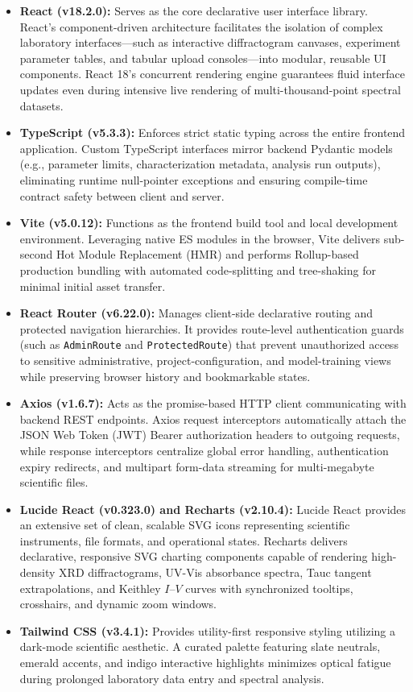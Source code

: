 \documentclass[12pt,a4paper,oneside]{report}
\begin{document}
{{{\begin{itemize}
    \item \textbf{React (v18.2.0):} Serves as the core declarative user interface library. React's component-driven architecture facilitates the isolation of complex laboratory interfaces—such as interactive diffractogram canvases, experiment parameter tables, and tabular upload consoles—into modular, reusable UI components. React 18's concurrent rendering engine guarantees fluid interface updates even during intensive live rendering of multi-thousand-point spectral datasets.
    \item \textbf{TypeScript (v5.3.3):} Enforces strict static typing across the entire frontend application. Custom TypeScript interfaces mirror backend Pydantic models (e.g., parameter limits, characterization metadata, analysis run outputs), eliminating runtime null-pointer exceptions and ensuring compile-time contract safety between client and server.
    \item \textbf{Vite (v5.0.12):} Functions as the frontend build tool and local development environment. Leveraging native ES modules in the browser, Vite delivers sub-second Hot Module Replacement (HMR) and performs Rollup-based production bundling with automated code-splitting and tree-shaking for minimal initial asset transfer.
    \item \textbf{React Router (v6.22.0):} Manages client-side declarative routing and protected navigation hierarchies. It provides route-level authentication guards (such as \texttt{AdminRoute} and \texttt{ProtectedRoute}) that prevent unauthorized access to sensitive administrative, project-configuration, and model-training views while preserving browser history and bookmarkable states.
    \item \textbf{Axios (v1.6.7):} Acts as the promise-based HTTP client communicating with backend REST endpoints. Axios request interceptors automatically attach the JSON Web Token (JWT) Bearer authorization headers to outgoing requests, while response interceptors centralize global error handling, authentication expiry redirects, and multipart form-data streaming for multi-megabyte scientific files.
    \item \textbf{Lucide React (v0.323.0) and Recharts (v2.10.4):} Lucide React provides an extensive set of clean, scalable SVG icons representing scientific instruments, file formats, and operational states. Recharts delivers declarative, responsive SVG charting components capable of rendering high-density XRD diffractograms, UV-Vis absorbance spectra, Tauc tangent extrapolations, and Keithley $I\text{--}V$ curves with synchronized tooltips, crosshairs, and dynamic zoom windows.
    \item \textbf{Tailwind CSS (v3.4.1):} Provides utility-first responsive styling utilizing a dark-mode scientific aesthetic. A curated palette featuring slate neutrals, emerald accents, and indigo interactive highlights minimizes optical fatigue during prolonged laboratory data entry and spectral analysis.
\end{itemize}

}}}
\end{document}

